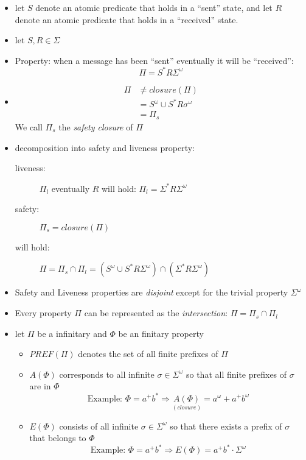 \documentclass[a4paper, 10pt]{article}
\begin{document}
\begin{itemize}
    \item let $S$ denote an atomic predicate that holds in a ``sent'' state, and let $R$ denote an atomic predicate that holds in a ``received'' state.
    \item let $S,R\in \Sigma$
    \item Property: when a message has been ``sent'' eventually it will be ``received'': \[ \Pi=S^*R\Sigma^\omega \]
    \item \begin{align*}
    \Pi & \not= closure(\Pi) \\
    &= S^\omega\cup S^*R\sigma^\omega \\
    &= \Pi_s
    \end{align*}
    We call $\Pi_s$ the \emph{safety closure} of $\Pi$
    \item decomposition into safety and liveness property:
    \begin{description}
        \item[liveness:] $\Pi_l$ eventually $R$ will hold: $\Pi_l=\Sigma^* R\Sigma^\omega$
        \item[safety:] $\Pi_s = closure(\Pi)$
        \item[will hold:] $\Pi=\Pi_s\cap\Pi_l=(S^\omega\cup S^*R\Sigma^\omega)\cap(\Sigma^* R \Sigma^\omega)$
    \end{description}
    \item Safety and Liveness properties are \emph{disjoint} except for the trivial property $\Sigma^\omega$
    \item Every property $\Pi$ can be represented as the \emph{intersection}: $\Pi=\Pi_s\cap\Pi_l$
    \item let $\Pi$ be a infinitary and $\Phi$ be an finitary property
    \begin{itemize}
        \item $PREF(\Pi)$ denotes the set of all finite prefixes of $\Pi$
        \item $A(\Phi)$ corresponds to all infinite $\sigma\in\Sigma^\omega$ so that all finite prefixes of $\sigma$ are in $\Phi$ \[ \textrm{Example: } \Phi=a^+b^*\Rightarrow \underset{(closure)}{A(\Phi)}=a^\omega+a^+b^\omega \]
        \item $E(\Phi)$ consists of all infinite $\sigma\in\Sigma^\omega$ so that there exists a prefix of $\sigma$ that belongs to $\Phi$ \[ \textrm{Example: } \Phi=a^+b^*\Rightarrow E(\Phi)=a^+b^*\cdot \Sigma^\omega \] \\

\end{itemize}
\end{itemize}
\end{document}

